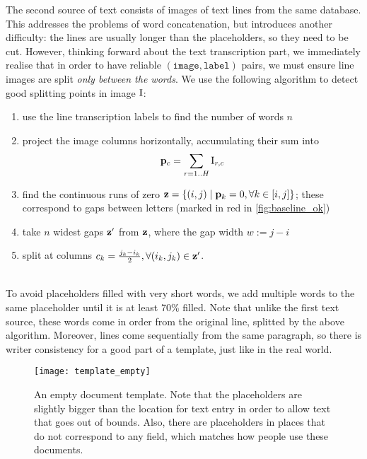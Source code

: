 			The second source of text consists of images of text lines from the same database. This addresses the problems of word concatenation, but introduces another difficulty: the lines are usually longer than the placeholders, so they need to be cut. However, thinking forward about the text transcription part, we immediately realise that in order to have reliable \((\mathtt{image}, \mathtt{label})\) pairs, we must ensure line images are split \emph{only between the words}. We use the following algorithm to detect good splitting points in image \(\mathrm{I}\): %
			\noindent\begin{minipage}{\linewidth}
			\begin{enumerate}
				\item use the line transcription labels to find the number of words \(n\)
				\item project the image columns horizontally, accumulating their sum into \[
					\mathbf{p}_c = \sum_{r = 1..H }\mathrm{I}_{r,c}
				\]
				\item find the continuous runs of zero \(\mathbf{z} = \{ (i, j) \mid \mathbf{p}_k = 0, \forall k \in [i, j] \}\); these correspond to gaps between letters (marked in red in \autoref{fig:baseline_ok})
				\item take \(n\) widest gaps \(\mathbf{z}'\) from \(\mathbf{z}\), where the gap width \(w := j - i\)
				\item split at columns \(c_k = \frac{j_k - i_k}{2}, \forall (i_k, j_k) \in \mathbf{z}'\).
			\end{enumerate}
			\end{minipage}
			\\

			To avoid placeholders filled with very short words, we add multiple words to the same placeholder until it is at least 70\% filled. Note that unlike the first text source, these words come in order from the original line, splitted by the above algorithm. Moreover, lines come sequentially from the same paragraph, so there is writer consistency for a good part of a template, just like in the real world.

			\begin{figure}
				\texttt{[image: template\_empty]}
				\caption[Document template]{An empty document template. Note that the placeholders are slightly bigger than the location for text entry in order to allow text that goes out of bounds. Also, there are placeholders in places that do not correspond to any field, which matches how people use these documents.}
				\label{fig:template}
			\end{figure}

